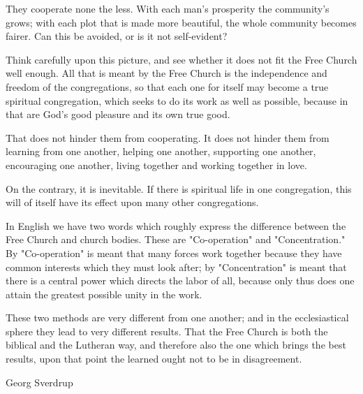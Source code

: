 They cooperate none the less. With each man’s prosperity the community’s grows; with each plot that is made more beautiful, the whole community becomes fairer. Can this be avoided, or is it not self-evident?

Think carefully upon this picture, and see whether it does not fit the Free Church well enough. All that is meant by the Free Church is the independence and freedom of the congregations, so that each one for itself may become a true spiritual congregation, which seeks to do its work as well as possible, because in that are God’s good pleasure and its own true good.

That does not hinder them from cooperating. It does not hinder them from learning from one another, helping one another, supporting one another, encouraging one another, living together and working together in love.

On the contrary, it is inevitable. If there is spiritual life in one congregation, this will of itself have its effect upon many other congregations.

In English we have two words which roughly express the difference between the Free Church and church bodies. These are "Co-operation" and "Concentration." By "Co-operation" is meant that many forces work together because they have common interests which they must look after; by "Concentration" is meant that there is a central power which directs the labor of all, because only thus does one attain the greatest possible unity in the work.

These two methods are very different from one another; and in the ecclesiastical sphere they lead to very different results. That the Free Church is both the biblical and the Lutheran way, and therefore also the one which brings the best results, upon that point the learned ought not to be in disagreement.

Georg Sverdrup
